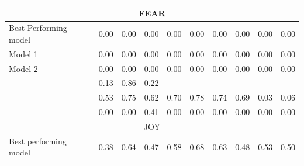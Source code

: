 \documentclass[11pt]{article}
\begin{document}
\begin{table}[!htbp]
\begin{tabular}{|l|l|l|l|l|l|l|l|l|l|}
\hline
    \multicolumn{10}{|c|}{{FEAR}} \\ 

\hline
    \tiny{Best Performing model} & 
    \footnotesize{0.00} & 
    \footnotesize{0.00} & 
    \footnotesize{0.00} & 
    \footnotesize{0.00} & 
    \footnotesize{0.00} & 
    \footnotesize{0.00} & 
    \footnotesize{0.00} & 
    \footnotesize{0.00} & 
    \footnotesize{0.00} \\ 

\hline
    \tiny{Model 1} & 
    \footnotesize{0.00} & 
    \footnotesize{0.00} & 
    \footnotesize{0.00} & 
    \footnotesize{0.00} & 
    \footnotesize{0.00} & 
    \footnotesize{0.00} & 
    \footnotesize{0.00} & 
    \footnotesize{0.00} & 
    \footnotesize{0.00} \\ 

\hline
    \tiny{Model 2} & 
    \footnotesize{0.00} & 
    \footnotesize{0.00} & 
    \footnotesize{0.00} & 
    \footnotesize{0.00} & 
    \footnotesize{0.00} & 
    \footnotesize{0.00} & 
    \footnotesize{0.00} & 
    \footnotesize{0.00} & 
    \footnotesize{0.00} \\     

\hline
    \tiny{\cite{strapparava2008learning} } &
    \footnotesize{0.13} & 
    \footnotesize{0.86} & 
    \footnotesize{0.22} & 
    &
    &
    &
    &
    &
    \\

\hline
    \tiny{\cite{kim2010evaluation} } &
    \footnotesize{0.53} & 
    \footnotesize{0.75} & 
    \footnotesize{0.62} &
    \footnotesize{0.70} & 
    \footnotesize{0.78} & 
    \footnotesize{0.74} &
    \footnotesize{0.69} & 
    \footnotesize{0.03} & 
    \footnotesize{0.06} \\

\hline
    \tiny{\cite{danisman2008feeler} } &
    \footnotesize{0.00} & 
    \footnotesize{0.00} & 
    \footnotesize{0.41} &
    \footnotesize{0.00} & 
    \footnotesize{0.00} & 
    \footnotesize{0.00} &
    \footnotesize{0.00} & 
    \footnotesize{0.00} & 
    \footnotesize{0.00} \\

\hline
    \multicolumn{10}{|c|}{{JOY}} \\ 

\hline
    \tiny{Best performing model} & 
    \footnotesize{0.38} & 
    \footnotesize{0.64} & 
    \footnotesize{0.47} & 
    \footnotesize{0.58} & 
    \footnotesize{0.68} & 
    \footnotesize{0.63} & 
    \footnotesize{0.48} & 
    \footnotesize{0.53} & 
    \footnotesize{0.50} \\ 


\end{tabular}
\end{table}
\end{document}
